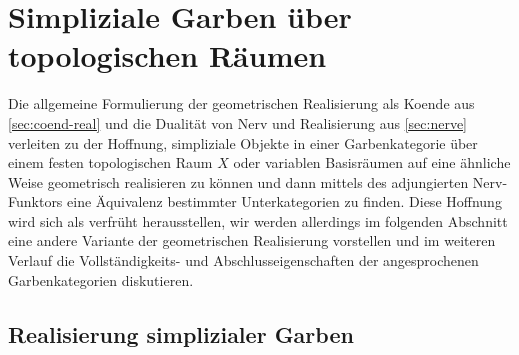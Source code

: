 
\chapter{Simpliziale Garben über topologischen Räumen}
\label{ch:simp-sheaves}

Die allgemeine Formulierung der geometrischen Realisierung als Koende
aus \autoref{sec:coend-real} und die Dualität von Nerv und
Realisierung aus \autoref{sec:nerve} verleiten zu der Hoffnung,
simpliziale Objekte in einer Garbenkategorie über einem festen
topologischen Raum $X$ oder variablen Basisräumen auf eine ähnliche
Weise geometrisch realisieren zu können und dann mittels des
adjungierten Nerv-Funktors eine Äquivalenz bestimmter Unterkategorien
zu finden. Diese Hoffnung wird sich als verfrüht herausstellen, wir
werden allerdings im folgenden Abschnitt eine andere Variante der
geometrischen Realisierung vorstellen und im weiteren Verlauf die
Vollständigkeits- und Abschlusseigenschaften der angesprochenen
Garbenkategorien diskutieren.

\section{Realisierung simplizialer Garben}
\label{sec:simp-sheaves-real}

